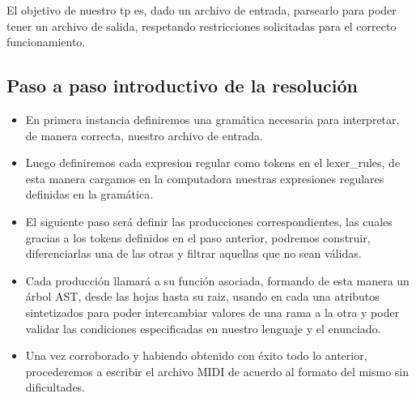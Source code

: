 El objetivo de nuestro tp es, dado un archivo de entrada, parsearlo para poder tener un archivo de salida, respetando restricciones solicitadas para el correcto funcionamiento.

\subsection{Paso a paso introductivo de la resolución}
\begin{itemize}
\item En primera instancia definiremos una gramática necesaria para interpretar, de manera correcta, nuestro archivo de entrada.
\item Luego definiremos cada expresion regular como tokens en el lexer\_rules, de esta manera cargamos en la computadora nuestras expresiones regulares definidas en la gramática.
\item El siguiente paso será definir las producciones correspondientes, las cuales gracias a los tokens definidos en el paso anterior, podremos construir, diferenciarlas una de las otras y filtrar aquellas que no sean válidas.
\item Cada producción llamará a su función asociada, formando de esta manera un árbol AST, desde las hojas hasta su raiz, usando en cada una atributos sintetizados para poder intercambiar valores de una rama a la otra y poder validar las condiciones especificadas en nuestro lenguaje y el enunciado.
\item Una vez corroborado y habiendo obtenido con éxito todo lo anterior, procederemos a escribir el archivo MIDI de acuerdo al formato del mismo sin dificultades.
\end{itemize}
